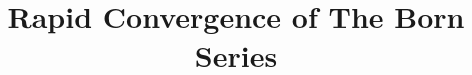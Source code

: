 \documentclass{beamer}
\title{Rapid Convergence of The Born Series}
\begin{document}
\begin{frame}
 \titlepage
\end{frame}
\end{document}
